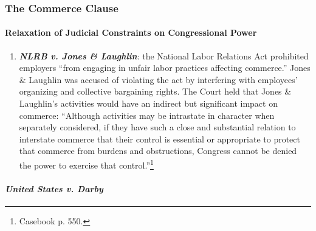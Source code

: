 \subsubsection{The Commerce Clause}

\paragraph{Relaxation of Judicial Constraints on Congressional Power}

\begin{enumerate}
    \item \emph{\textbf{NLRB v. Jones \& Laughlin}}: the National Labor 
    Relations Act prohibited employers ``from engaging in unfair labor 
    practices affecting commerce.'' Jones \& Laughlin was accused of violating 
    the act by interfering with employees' organizing and collective 
    bargaining rights. The Court held that Jones \& Laughlin's activities 
    would have an indirect but significant impact on commerce: ``Although 
    activities may be intrastate in character when separately considered, if 
    they have such a close and substantial relation to interstate commerce 
    that their control is essential or appropriate to protect that commerce 
    from burdens and obstructions, Congress cannot be denied the power to 
    exercise that control.''\footnote{Casebook p. 550.}
\end{enumerate}

\paragraph{\emph{United States v. Darby}}

